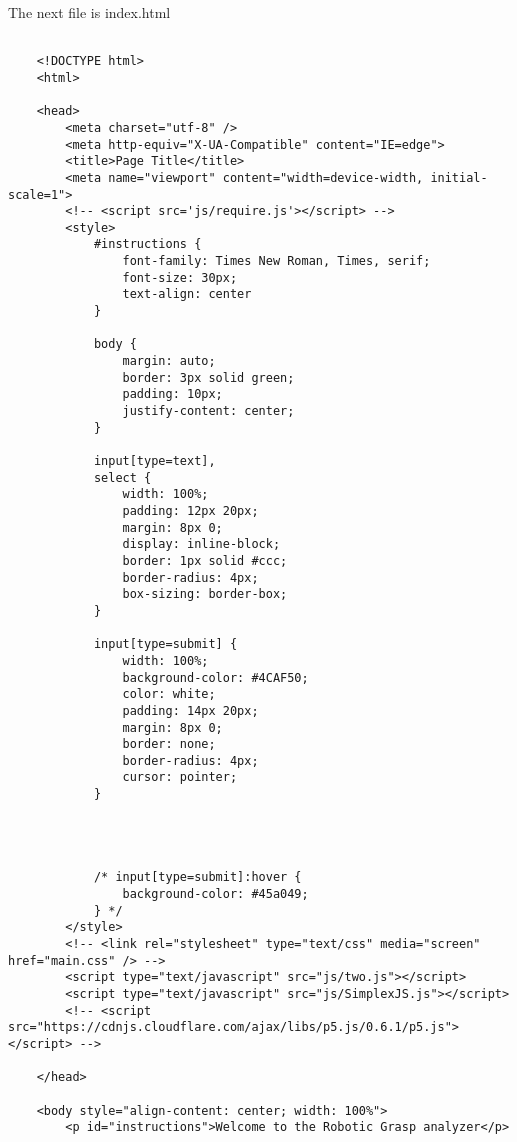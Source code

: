 \documentclass[letterpaper, 10 pt, conference]{ieeeconf}
\begin{document}
    \onecolumn
    The next file is index.html
    \begin{lstlisting}[style=htmlcssjs]
    
    <!DOCTYPE html>
    <html>
    
    <head>
        <meta charset="utf-8" />
        <meta http-equiv="X-UA-Compatible" content="IE=edge">
        <title>Page Title</title>
        <meta name="viewport" content="width=device-width, initial-scale=1">
        <!-- <script src='js/require.js'></script> -->
        <style>
            #instructions {
                font-family: Times New Roman, Times, serif;
                font-size: 30px;
                text-align: center
            }
    
            body {
                margin: auto;
                border: 3px solid green;
                padding: 10px;
                justify-content: center;
            }
    
            input[type=text],
            select {
                width: 100%;
                padding: 12px 20px;
                margin: 8px 0;
                display: inline-block;
                border: 1px solid #ccc;
                border-radius: 4px;
                box-sizing: border-box;
            }
    
            input[type=submit] {
                width: 100%;
                background-color: #4CAF50;
                color: white;
                padding: 14px 20px;
                margin: 8px 0;
                border: none;
                border-radius: 4px;
                cursor: pointer;
            }
    
            
    
    
            /* input[type=submit]:hover {
                background-color: #45a049;
            } */
        </style>
        <!-- <link rel="stylesheet" type="text/css" media="screen" href="main.css" /> -->
        <script type="text/javascript" src="js/two.js"></script>
        <script type="text/javascript" src="js/SimplexJS.js"></script>
        <!-- <script src="https://cdnjs.cloudflare.com/ajax/libs/p5.js/0.6.1/p5.js"></script> -->
        
    </head>
    
    <body style="align-content: center; width: 100%">
        <p id="instructions">Welcome to the Robotic Grasp analyzer</p>
    

\end{lstlisting}
\end{document}
